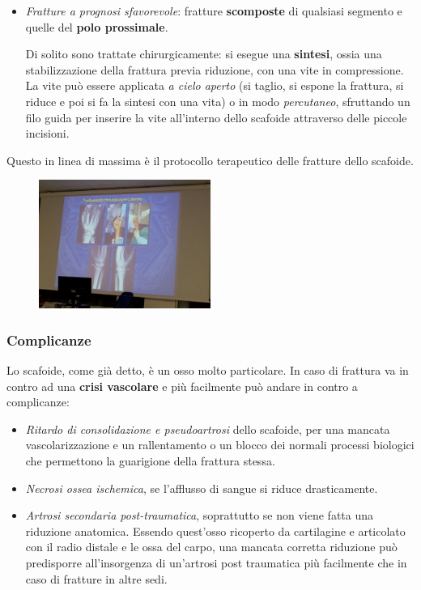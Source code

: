 \begin{itemize}
\item
  \emph{Fratture a prognosi sfavorevole}: fratture \textbf{scomposte} di qualsiasi segmento e quelle del \textbf{polo prossimale}.

Di solito sono trattate chirurgicamente: si esegue una \textbf{sintesi}, ossia una stabilizzazione della frattura previa riduzione, con una vite
in compressione. La vite può essere applicata \emph{a cielo aperto} (si taglio, si espone la frattura, si riduce e poi si fa la sintesi con una
vita) o in modo \emph{percutaneo}, sfruttando un filo guida per inserire la vite all'interno dello scafoide attraverso delle piccole incisioni.
\end{itemize}

Questo in linea di massima è il protocollo terapeutico delle fratture
dello scafoide.

\begin{figure}[!ht]
\centering
\includegraphics[width=0.5\textwidth]{004/image4.jpeg}
\end{figure}

\subsubsection{Complicanze}

Lo scafoide, come già detto, è un osso molto particolare. In caso di frattura va in contro ad una \textbf{crisi vascolare} e più facilmente può andare in contro a complicanze:

\begin{itemize}
\item
  \emph{Ritardo di consolidazione e pseudoartrosi} dello scafoide, per una mancata vascolarizzazione e un rallentamento o un blocco dei normali processi biologici che permettono la guarigione della frattura stessa.
\item
  \emph{Necrosi ossea ischemica}, se l'afflusso di sangue si riduce drasticamente.
\item
  \emph{Artrosi secondaria post-traumatica}, soprattutto se non viene fatta una riduzione anatomica. Essendo quest'osso ricoperto da cartilagine e articolato con il radio distale e le ossa del carpo, una mancata corretta riduzione può predisporre all'insorgenza di un'artrosi post traumatica più facilmente che in caso di fratture in altre sedi.
\end{itemize}

